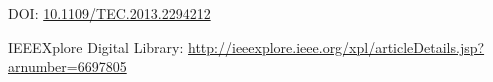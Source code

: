 \documentclass[a4paper,12pt]{article}
\newcommand{\doi}[1]{DOI: \href{http://dx.doi.org/#1}{#1}}
\begin{document}
\thispagestyle{empty}

\vspace{3cm}

\nocite{FAI-art-27}
\printbibliography

\vspace{3cm}
\doi{10.1109/TEC.2013.2294212}

\vspace{1.5cm}
IEEEXplore Digital Library:
\url{http://ieeexplore.ieee.org/xpl/articleDetails.jsp?arnumber=6697805}

\newpage

\end{document}
